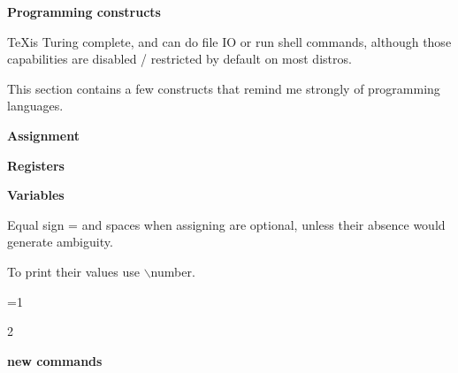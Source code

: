 \def\bs{$\backslash$}
\def\bo{$\{$}
\def\bc{$\}$}
\def\code#1{#1}
\def\section#1{{\bf #1}}
\def\subsection#1{{\bf #1}}
\def\subsubsection#1{{\bf #1}}

\section{Programming constructs}

  \TeX is Turing complete, and can do file IO or run shell commands, although those capabilities are disabled / restricted by default on most distros.

  This section contains a few constructs that remind me strongly of programming languages.

  \subsection{Assignment}

  \subsection{Registers}

  \subsection{Variables}

    Equal sign = and spaces when assigning are optional, unless their absence would generate ambiguity.

    To print their values use \bs number.

    =1

    \number{}

     2

    \number{}


  \subsection{new commands}

